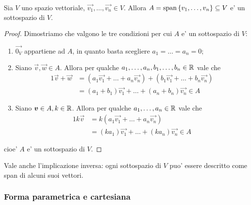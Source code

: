 \begin{proposition}
    Sia $V$ uno spazio vettoriale, $\vec{v_1}, \dots, \vec{v_n} \in V$. Allora $A = \operatorname{span}\left\{v_1, \dots, v_n\right\} \subseteq V$ e' un sottospazio di $V$.
\end{proposition}
\begin{proof}
    Dimostriamo che valgono le tre condizioni per cui $A$ e' un sottospazio di $V$:
    \begin{enumerate}
        \item $\vec{0_V}$ appartiene ad $A$, in quanto basta scegliere $a_1 = \dots = a_n = 0$;
        \item Siano $\vec{v}, \vec{w} \in A$. Allora per qualche $a_1, \dots, a_n, b_1, \dots, b_n \in \mathbb{R}$ vale che \begin{alignat*}{1}
            \vec{v} + \vec{w} &= (a_1\vec{v_1} + \dots + a_n\vec{v_n}) + (b_1\vec{v_1} + \dots + b_n\vec{v_n}) \\
            &= (a_1 + b_1)\vec{v_1} + \dots + (a_n + b_n)\vec{v_n} \in A
        \end{alignat*}
        \item Siano $\bm{v} \in A, k \in \mathbb{R}$. Allora per qualche $a_1, \dots, a_n \in \mathbb{R}$ vale che \begin{alignat*}{1}
            k\vec{v} &= k(a_1\vec{v_1} + \dots + a_n\vec{v_n})  \\
            &= (ka_1)\vec{v_1} + \dots + (ka_n)\vec{v_n} \in A
        \end{alignat*}
    \end{enumerate}
    cioe' $A$ e' un sottospazio di $V$.
\end{proof}

Vale anche l'implicazione inversa: ogni sottospazio di $V$ puo' essere descritto come span di alcuni suoi vettori.

\subsubsection{Forma parametrica e cartesiana}

